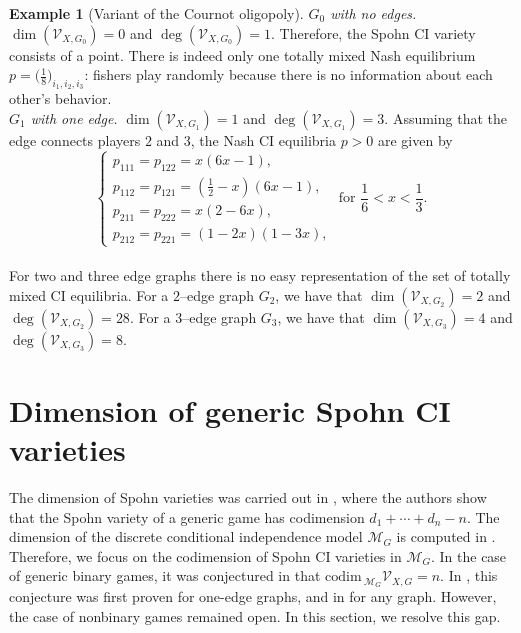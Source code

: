 \documentclass[11pt]{amsart}
\numberwithin{equation}{section}
\theoremstyle{plain}
\numberwithin{theorem}{section}
\theoremstyle{definition}
\newtheorem{example}[theorem]{Example}
\begin{document}
\begin{example}[Variant of the Cournot oligopoly]
\emph{$G_0$ with no edges.} $\dim(\mathcal V_{X,G_0})=0$ and $\deg(\mathcal V_{X,G_0})=1$. Therefore, the Spohn CI variety consists of a point. There is indeed only one totally mixed Nash equilibrium $p=\big(\frac18\big)_{i_1,i_2,i_3}$: fishers play randomly because there is no information about each other's behavior.\\
\indent \emph{$G_1$ with one edge.} $\dim(\mathcal V_{X,G_1})=1$ and $\deg(\mathcal V_{X,G_1})=3$. Assuming that the edge connects players $2$ and $3$, the Nash CI equilibria $p>0$ are given by
    $$\left\{\begin{array}{l}
      p_{111}=p_{122}=x(6x-1), \\
      p_{112}=p_{121}=(\frac12-x)(6x-1),\\
      p_{211}=p_{222}=x(2-6x),\\
      p_{212}=p_{221}=(1-2x)(1-3x),
\end{array}\right.\text{ for }\frac16<x<\frac13.$$ \\
\noindent For two and three edge graphs there is no easy representation of the set of totally mixed CI equilibria. For a $2$--edge graph $G_2$, we have that $\dim(\mathcal V_{X,G_2})=2$ and $\deg(\mathcal  V_{X,G_2})=28$. For a $3$--edge graph $G_3$, we have that $\dim(\mathcal V_{X,G_3})=4$ and $\deg(\mathcal V_{X,G_3})=8$.

    
\end{example}

\section{Dimension of generic Spohn CI varieties}\label{sec:dim}

The dimension of Spohn varieties was carried out in \cite[Theorem 6]{portakal2022geometry}, where the authors show that the Spohn variety of a generic game has codimension $d_1+\cdots+d_n-n$. The dimension of the discrete conditional independence model $\mathcal M_G$ is computed in \cite[Corollary 2.7]{hocsten2002grobner}. Therefore, we focus on the codimension of Spohn CI varieties in $\mathcal{M}_G$.
In the case of generic binary games, it was conjectured in \cite[Conjecture 24]{portakal2022geometry} that $
\mathrm{codim}\,_{\mathcal{M}_G} \mathcal{V}_{X,G} = n$.
In \cite[Proposition 4]{portakal2024nash}, this conjecture was first proven for one-edge graphs, and in \cite[Theorem 9]{portakal2024game} for any graph. However, the case of nonbinary games remained open. In this section, we resolve this gap. 
\end{document}
